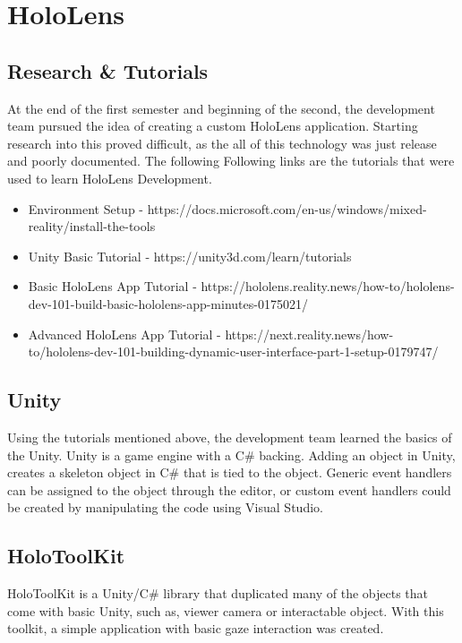  \section{HoloLens}

    \subsection{Research \& Tutorials}

     At the end of the first semester and beginning of the second, the development team pursued the idea of creating a custom HoloLens application.
     Starting research into this proved difficult, as the all of this technology was just release and poorly documented. The following
     Following links are the tutorials that were used to learn HoloLens Development.

    \begin{itemize}
        \item Environment Setup - https://docs.microsoft.com/en-us/windows/mixed-reality/install-the-tools
        \item Unity Basic Tutorial - https://unity3d.com/learn/tutorials
        \item Basic HoloLens App Tutorial - https://hololens.reality.news/how-to/hololens-dev-101-build-basic-hololens-app-minutes-0175021/
        \item Advanced HoloLens App Tutorial - https://next.reality.news/how-to/hololens-dev-101-building-dynamic-user-interface-part-1-setup-0179747/
    \end{itemize}

    \subsection{Unity}
    Using the tutorials mentioned above, the development team learned the basics of the Unity. Unity is a game engine with a C\# backing.
    Adding an object in Unity, creates a skeleton object in C\# that is tied to the object. Generic event handlers can be assigned to the object through
    the editor, or custom event handlers could be created by manipulating the code using Visual Studio. 

    \subsection{HoloToolKit}
    HoloToolKit is a Unity/C\# library that duplicated many of the objects that come with basic Unity, such as, viewer camera or interactable object.
    With this toolkit, a simple application with basic gaze interaction was created.
    
